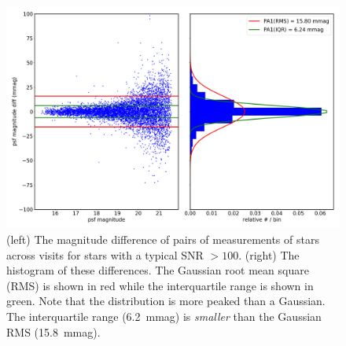 \documentclass[twocolumn]{aastex62}
\begin{document}
\begin{figure}
\centering
\includegraphics[width=0.9\columnwidth]{DC1-imsim-dithered_r_PA1.png}
\caption{(left) The magnitude difference of pairs of measurements of stars across visits for stars with a typical SNR $>100$.  (right) The histogram of these differences.  The Gaussian root mean square (RMS) is shown in red while the interquartile range is shown in green. Note that the distribution is more peaked than a Gaussian. The interquartile range (6.2~mmag) is {\em smaller} than the Gaussian RMS (15.8~mmag).}
\label{fig:validate_drp_PA1}
\end{figure}
\end{document}
